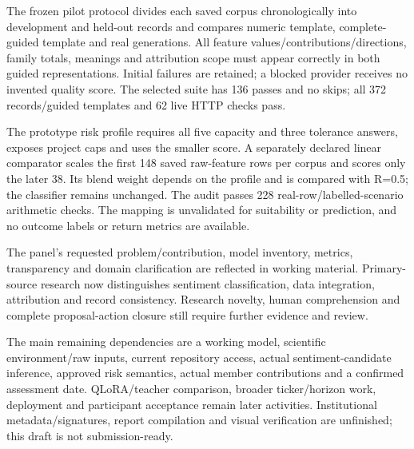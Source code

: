 The frozen pilot protocol divides each saved corpus chronologically into development and held-out records and compares numeric template, complete-guided template and real generations. All feature values/contributions/directions, family totals, meanings and attribution scope must appear correctly in both guided representations. Initial failures are retained; a blocked provider receives no invented quality score. The selected suite has 136 passes and no skips; all 372 records/guided templates and 62 live HTTP checks pass.

The prototype risk profile requires all five capacity and three tolerance answers, exposes project caps and uses the smaller score. A separately declared linear comparator scales the first 148 saved raw-feature rows per corpus and scores only the later 38. Its blend weight depends on the profile and is compared with R=0.5; the classifier remains unchanged. The audit passes 228 real-row/labelled-scenario arithmetic checks. The mapping is unvalidated for suitability or prediction, and no outcome labels or return metrics are available.

The panel's requested problem/contribution, model inventory, metrics, transparency and domain clarification are reflected in working material. Primary-source research now distinguishes sentiment classification, data integration, attribution and record consistency. Research novelty, human comprehension and complete proposal-action closure still require further evidence and review.

The main remaining dependencies are a working model, scientific environment/raw inputs, current repository access, actual sentiment-candidate inference, approved risk semantics, actual member contributions and a confirmed assessment date. QLoRA/teacher comparison, broader ticker/horizon work, deployment and participant acceptance remain later activities. Institutional metadata/signatures, report compilation and visual verification are unfinished; this draft is not submission-ready.
